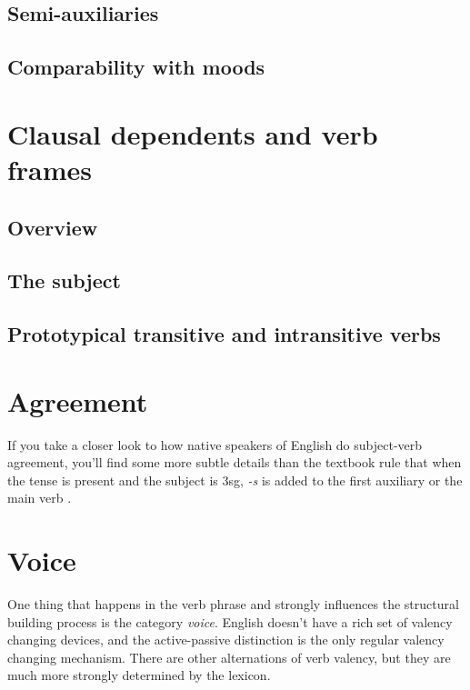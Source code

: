\documentclass[UTF8, a4paper, oneside, scheme=plain, 12pt]{ctexbook}
\newcommand*{\citesec}[1]{\S~{#1}}
\newcommand*{\citechap}[1]{Ch.~{#1}}
\newcommand{\form}[1]{\emph{#1}}
\begin{document}
\subsection{Semi-auxiliaries}\label{sec:semi-auxiliary}

\subsection{Comparability with moods}\label{sec:tam-mood-compatibility}


\section{Clausal dependents and verb frames}\label{sec:valency.overview}

\subsection{Overview}








\subsection{The subject}\label{sec:subject}

\subsection{Prototypical transitive and intransitive verbs}


\section{Agreement}

If you take a closer look to how native speakers of English do subject-verb agreement,
you'll find some more subtle details than 
the textbook rule that when the tense is \acl{present}
and the subject is 3sg, 
\form{-s} is added to the first auxiliary or the main verb
\citep[\citechap{5}, \citesec{18}]{cgel}.

\section{Voice} 

One thing that happens in the verb phrase 
and strongly influences the structural building process is the category \emph{voice}.
English doesn't have a rich set of valency changing devices,
and the active-passive distinction is the only regular valency changing mechanism.
There are other alternations of verb valency,
but they are much more strongly determined by the lexicon. 
\end{document}
